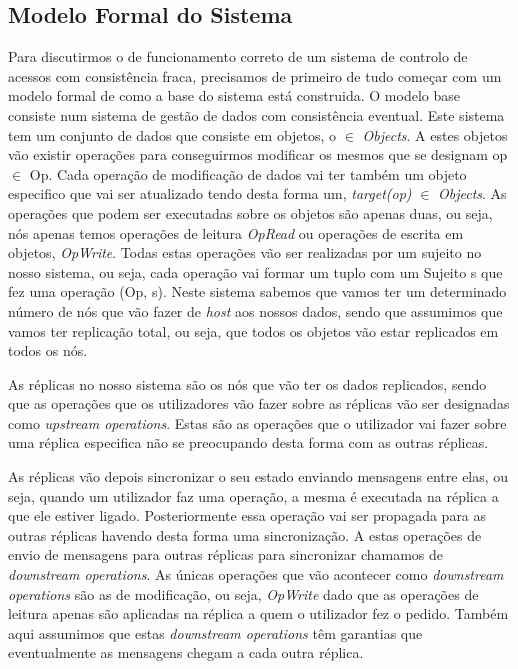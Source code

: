 \documentclass[runningheads,a4paper]{llncs}
\begin{document}
\subsection{Modelo Formal do Sistema} \label{mfs}

Para discutirmos o de funcionamento correto de um sistema de controlo de acessos com consistência fraca, precisamos de primeiro de tudo começar com um modelo formal de como a base do sistema está construida. 
O modelo base consiste num sistema de gestão de dados com consistência eventual. Este sistema tem um conjunto de dados que consiste em objetos, o $ \in $ \textit{Objects}. A estes objetos vão existir operações para conseguirmos modificar os mesmos que se designam op $ \in $ Op. Cada operação de modificação de dados vai ter também um objeto especifico que vai ser atualizado tendo desta forma um, \textit{target(op)} $ \in $ \textit{Objects}. As operações que podem ser executadas sobre os objetos são apenas duas, ou seja, nós apenas temos operações de leitura \textit{OpRead} ou operações de escrita em objetos, \textit{OpWrite}. Todas estas operações vão ser realizadas por um sujeito no nosso sistema, ou seja, cada operação vai formar um tuplo com um Sujeito s que fez uma operação (Op, s).
Neste sistema sabemos que vamos ter um determinado número de nós que vão fazer de \textit{host} aos nossos dados, sendo que assumimos que vamos ter replicação total, ou seja, que todos os objetos vão estar replicados em todos os nós.

As réplicas no nosso sistema são os nós que vão ter os dados replicados, sendo que as operações que os utilizadores vão fazer sobre as réplicas vão ser designadas como \textit{upstream operations}. Estas são as operações que o utilizador vai fazer sobre uma réplica especifica não se preocupando desta forma com as outras réplicas.

As réplicas vão depois sincronizar o seu estado enviando mensagens entre elas, ou seja, quando um utilizador faz uma operação, a mesma é executada na réplica a que ele estiver ligado. Posteriormente essa operação vai ser propagada para as outras réplicas havendo desta forma uma sincronização. A estas operações de envio de mensagens para outras réplicas para sincronizar chamamos de \textit{downstream operations}. As únicas operações que vão acontecer como \textit{downstream operations} são as de modificação, ou seja, \textit{OpWrite} dado que as operações de leitura apenas são aplicadas na réplica a quem o utilizador fez o pedido. Também aqui assumimos que estas \textit{downstream operations} têm garantias que eventualmente as mensagens chegam a cada outra réplica.
\end{document}
